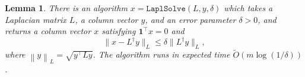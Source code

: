 \documentclass[sigconf]{acmart}
\newtheorem{lemma}[theorem]{Lemma}
\def\norm#1{\left\| #1 \right\|}
\newcommand\qq{\boldsymbol{\mathit{q}}}
\newcommand\yy{\boldsymbol{\mathit{y}}}
\newcommand\zz{\boldsymbol{\mathit{z}}}
\newcommand\xx{\boldsymbol{\mathit{x}}}
\newcommand\LL{\boldsymbol{\mathit{L}}}
\newcommand\Otil{\widetilde{O}}
\newcommand{\one}{\mathbf{1}}
\begin{document}

\begin{lemma}%
	\label{lemma:ST}
	There is an algorithm $\xx = \mathtt{LaplSolve}(\LL,\yy,\delta)$ which
	takes a Laplacian matrix $\LL$,
	a column vector $\yy$, and an error
	parameter $\delta > 0$, and returns a column vector $\xx$ satisfying  $\boldsymbol{1}^\top\xx = 0$ and
	\[
		\|\xx - \LL^{\dagger} \yy\|_{\LL} \leq \delta \|\LL^{\dagger} \yy\|_{\LL},
	\]
	where $\norm{\yy}_{\LL} = \sqrt{\yy^{\top} \LL \yy}$.
	The algorithm runs in expected time $\Otil \left(m \log(1/\delta) \right)$.
\end{lemma}
\end{document}
